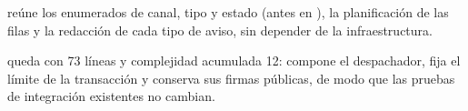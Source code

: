 \documentclass[11pt,a4paper]{article}
\newcommand{\codigo}[2]{}
\begin{document}
  reúne los enumerados de canal, tipo y estado (antes en ), la planificación de las filas y la redacción de cada tipo de aviso, sin depender de la infraestructura.

\codigo{despues_notices.py}{\ev{E-07}. Diseño propuesto: \cod{domain/notices.py}.}

\clearpage
{}  queda con 73 líneas y complejidad acumulada 12: compone el despachador, fija el límite de la transacción y conserva sus firmas públicas, de modo que las pruebas de integración existentes no cambian.

\codigo{despues_notification_service.py}{\ev{E-07}. Diseño propuesto: \cod{services/notification\_service.py} como coordinador.}
\end{document}
